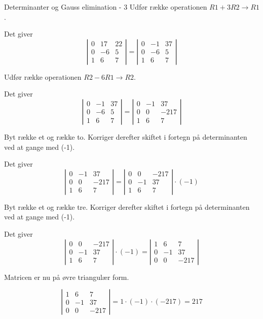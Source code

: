 \documentclass{article}
\begin{document}
\begin{exercise}{Determinanter og Gauss elimination - 3}
\hint
Udfør række operationen
$R1 + 3R2 \to R1$.

\hint
Det giver
\[
\left|\begin{array}{rrr}
0 & 17 & 22 \\
0 & -6 & 5 \\
1 & 6 & 7
\end{array} \right|
=
\left|\begin{array}{rrr}
0 & -1 & 37 \\
0 & -6 & 5 \\
1 & 6 & 7
\end{array} \right|
\]

\hint
Udfør række operationen
$R2 - 6R1 \to R2$.

\hint
Det giver
\[
\left|\begin{array}{rrr}
0 & -1 & 37 \\
0 & -6 & 5 \\
1 & 6 & 7
\end{array} \right|
=
\left|\begin{array}{rrr}
0 & -1 & 37 \\
0 & 0 & -217 \\
1 & 6 & 7
\end{array} \right|
\]

\hint
Byt række et og række to.
Korriger derefter skiftet i fortegn på determinanten ved at
gange med (-1).

\hint
Det giver
\[
\left|\begin{array}{rrr}
0 & -1 & 37 \\
0 & 0 & -217 \\
1 & 6 & 7
\end{array} \right|
=
\left|\begin{array}{rrr}
0 & 0 & -217 \\
0 & -1 & 37 \\
1 & 6 & 7
\end{array} \right| \cdot (-1)
\]

\hint
Byt række et og række tre.
Korriger derefter skiftet i fortegn på determinanten ved at
gange med (-1).

\hint
Det giver
\[
\left|\begin{array}{rrr}
0 & 0 & -217 \\
0 & -1 & 37 \\
1 & 6 & 7
\end{array} \right| \cdot (-1)
=
\left|\begin{array}{rrr}
1 & 6 & 7 \\
0 & -1 & 37 \\
0 & 0 & -217
\end{array} \right|
\]

\hint
Matricen er nu på øvre triangulær form.

\hint
\[
\left|\begin{array}{rrr}
1 & 6 & 7 \\
0 & -1 & 37 \\
0 & 0 & -217
\end{array} \right|
= 1 \cdot (-1) \cdot (-217) = 217
\]


\end{exercise}
\end{document}
